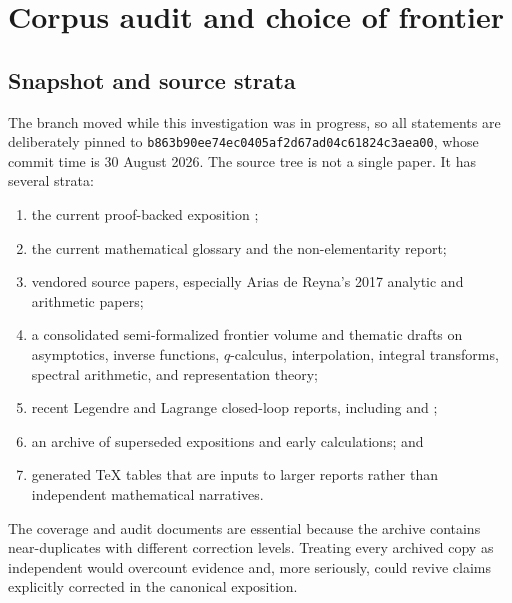 \documentclass[11pt,oneside]{article}
\theoremstyle{definition}
\theoremstyle{remark}
\numberwithin{equation}{section}
\newcommand{\commit}{\nolinkurl{b863b90ee74ec0405af2d67ad04c61824c3aea00}}
\begin{document}
\tableofcontents
\clearpage

\section{Corpus audit and choice of frontier}
\label{sec:audit}

\subsection{Snapshot and source strata}
The branch moved while this investigation was in progress, so all statements
are deliberately pinned to \commit, whose commit time is 30 August 2026.  The
source tree is not a single paper.  It has several strata:
\begin{enumerate}
\item the current proof-backed exposition
;
\item the current mathematical glossary and the non-elementarity report;
\item vendored source papers, especially Arias de Reyna's 2017 analytic and
      arithmetic papers;
\item a consolidated semi-formalized frontier volume and thematic drafts on
      asymptotics, inverse functions, $q$-calculus, interpolation, integral
      transforms, spectral arithmetic, and representation theory;
\item recent Legendre and Lagrange closed-loop reports, including
       and
      ;
\item an archive of superseded expositions and early calculations; and
\item generated TeX tables that are inputs to larger reports rather than
      independent mathematical narratives.
\end{enumerate}
The coverage and audit documents are essential because the archive contains
near-duplicates with different correction levels.  Treating every archived
copy as independent would overcount evidence and, more seriously, could revive
claims explicitly corrected in the canonical exposition.
\end{document}
